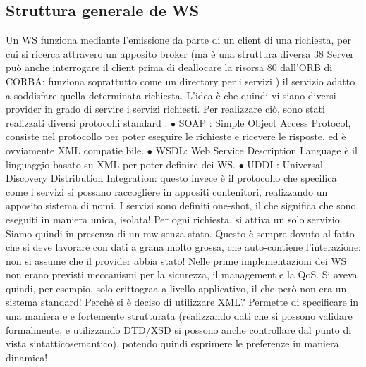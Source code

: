 \subsection{Struttura generale de WS}
Un WS funziona mediante l'emissione da parte di un client di una richiesta,
per cui si ricerca attravero un apposito broker (ma è una struttura diversa
38 Server
può anche interrogare il client prima di deallocare la risorsa
80
dall'ORB di CORBA: funziona soprattutto come un directory per i servizi ) il
servizio adatto a soddisfare quella determinata richiesta.
L'idea è che quindi vi siano diversi provider in grado di servire i servizi
richiesti. Per realizzare ciò, sono stati realizzati diversi protocolli standard :
$\bullet$ SOAP : Simple Object Access Protocol, consiste nel protocollo per poter
eseguire le richieste e ricevere le risposte, ed è ovviamente XML compatie
bile.
$\bullet$ WSDL: Web Service Description Language è il linguaggio basato su XML
per poter definire dei WS.
$\bullet$ UDDI : Universal Discovery Distribution Integration: questo invece è il
protocollo che specifica come i servizi si possano raccogliere in appositi
contenitori, realizzando un apposito sistema di nomi.
I servizi sono definiti one-shot, il che significa che sono eseguiti in maniera unica,
isolata! Per ogni richiesta, si attiva un solo servizio. Siamo quindi in presenza
di un mw senza stato. Questo è sempre dovuto al fatto che si deve lavorare con
dati a grana molto grossa, che auto-contiene l'interazione: non si assume che il
provider abbia stato!
Nelle prime implementazioni dei WS non erano previsti meccanismi per la
sicurezza, il management e la QoS. Si aveva quindi, per esempio, solo crittograa
a livello applicativo, il che però non era un sistema standard!
Perché si è deciso di utilizzare XML? Permette di specificare in una maniera
e e
fortemente strutturata (realizzando dati che si possono validare formalmente, e
utilizzando DTD/XSD si possono anche controllare dal punto di vista sintatticosemantico), potendo quindi esprimere le
preferenze in maniera dinamica!
